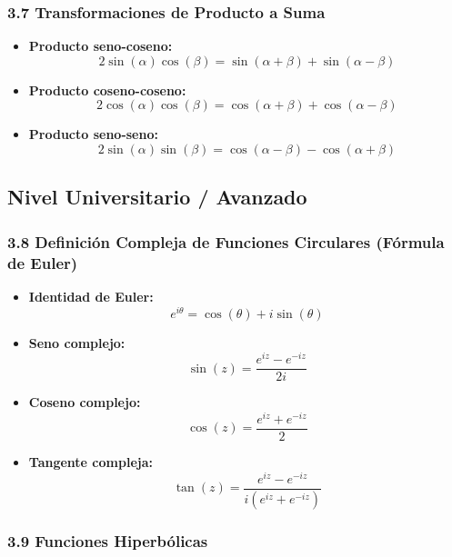 \documentclass[11pt,a4paper]{article}
\begin{document}
\subsubsection*{3.7 Transformaciones de Producto a Suma}

\begin{itemize}
  \item \textbf{Producto seno-coseno:}
  \[
    2\sin(\alpha)\cos(\beta) = \sin(\alpha + \beta) + \sin(\alpha - \beta)
  \]
  \item \textbf{Producto coseno-coseno:}
  \[
    2\cos(\alpha)\cos(\beta) = \cos(\alpha + \beta) + \cos(\alpha - \beta)
  \]
  \item \textbf{Producto seno-seno:}
  \[
    2\sin(\alpha)\sin(\beta) = \cos(\alpha - \beta) - \cos(\alpha + \beta)
  \]
\end{itemize}

\subsection*{Nivel Universitario / Avanzado}

\subsubsection*{3.8 Definición Compleja de Funciones Circulares (Fórmula de Euler)}

\begin{itemize}
  \item \textbf{Identidad de Euler:}
  \[
    e^{i\theta} = \cos(\theta) + i\sin(\theta)
  \]
  \item \textbf{Seno complejo:}
  \[
    \sin(z) = \frac{e^{iz} - e^{-iz}}{2i}
  \]
  \item \textbf{Coseno complejo:}
  \[
    \cos(z) = \frac{e^{iz} + e^{-iz}}{2}
  \]
  \item \textbf{Tangente compleja:}
  \[
    \tan(z) = \frac{e^{iz} - e^{-iz}}{i(e^{iz} + e^{-iz})}
  \]
\end{itemize}

\subsubsection*{3.9 Funciones Hiperbólicas}
\end{document}
